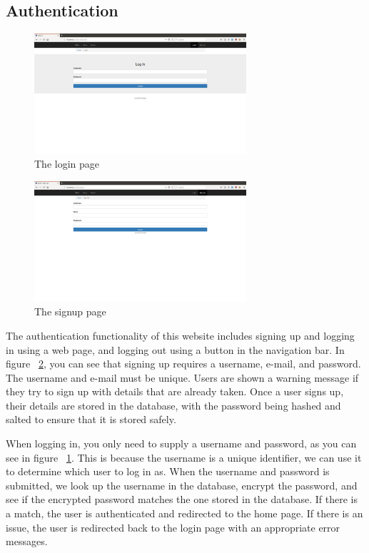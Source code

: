 \subsection{Authentication}

\begin{figure}[htb]
    \centering
    \includegraphics[width=0.7\textwidth]{final_report/pics/login.png}
    \caption{The login page}
    \label{fig:wireLogin}
\end{figure}

\begin{figure}[htb]
    \centering
    \includegraphics[width=0.7\textwidth]{final_report/pics/signup.png}
    \caption{The signup page}
    \label{fig:wireSignup}
\end{figure}

The authentication functionality of this website includes signing up and
logging in using a web page, and logging out using a button in the navigation
bar. In figure ~\ref{fig:wireSignup}, you can see that signing up requires
a username, e-mail, and password. The username and e-mail must be unique.
Users are shown a warning message if they try to sign up with details that
are already taken. Once a user signs up, their details are stored in the
database, with the password being hashed and salted to ensure that it is
stored safely.

When logging in, you only need to supply a username and password, as you can
see in figure ~\ref{fig:wireLogin}. This is because the username is a unique
identifier, we can use it to determine which user to log in as. When the username
and password is submitted, we look up the username in the database, encrypt the
password, and see if the encrypted password matches the one stored in the database. 
If there is a match, the user is authenticated and redirected to the home page. 
If there is an issue, the user is redirected back to the login page with an 
appropriate error messages.

